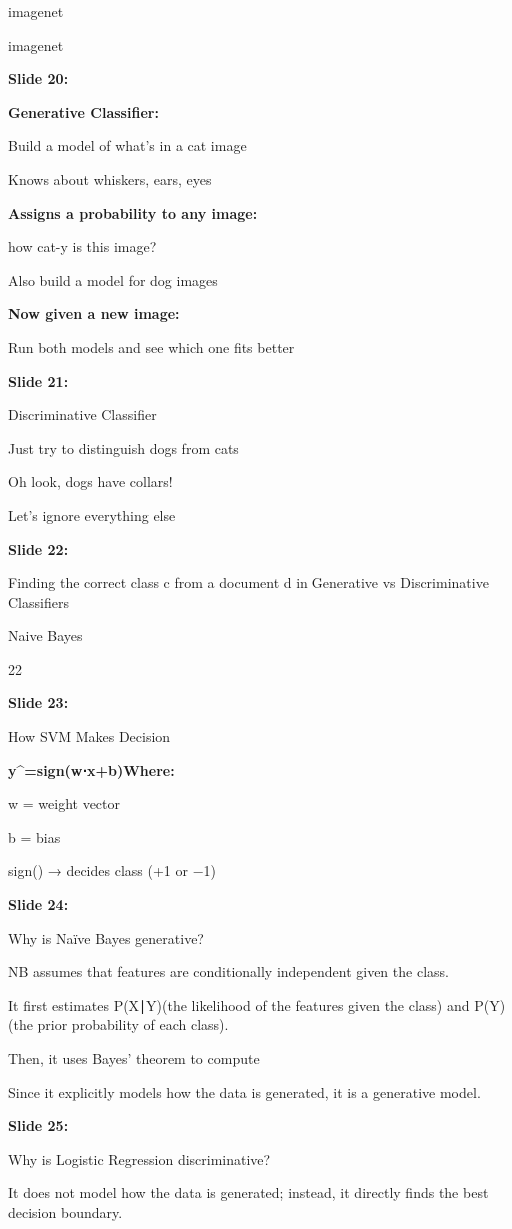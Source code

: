 \documentclass[11pt,a4paper]{article}
\begin{document}
imagenet

imagenet

\textbf{Slide 20:}

\textbf{Generative Classifier:} 

Build a model of what's in a cat image

Knows about whiskers, ears, eyes

\textbf{Assigns a probability to any image:} 

how cat-y is this image?

Also build a model for dog images

\textbf{Now given a new image:} 

Run both models and see which one fits better

\textbf{Slide 21:}

Discriminative Classifier

Just try to distinguish dogs from cats

Oh look, dogs have collars!

Let's ignore everything else

\textbf{Slide 22:}

Finding the correct class c from a document d inGenerative vs Discriminative Classifiers

Naive Bayes

22

\textbf{Slide 23:}

How SVM Makes Decision

\textbf{y^=sign(w⋅x+b)Where:} 

w = weight vector

b = bias

sign() → decides class (+1 or −1)

\textbf{Slide 24:}

Why is Naïve Bayes generative?

NB assumes that features are conditionally independent given the class.

It first estimates P(X∣Y)(the likelihood of the features given the class) and P(Y) (the prior probability of each class).

Then, it uses Bayes' theorem to compute

Since it explicitly models how the data is generated, it is a generative model.

\textbf{Slide 25:}

Why is Logistic Regression discriminative?​

It does not model how the data is generated; instead, it directly finds the best decision boundary.​
\end{document}
